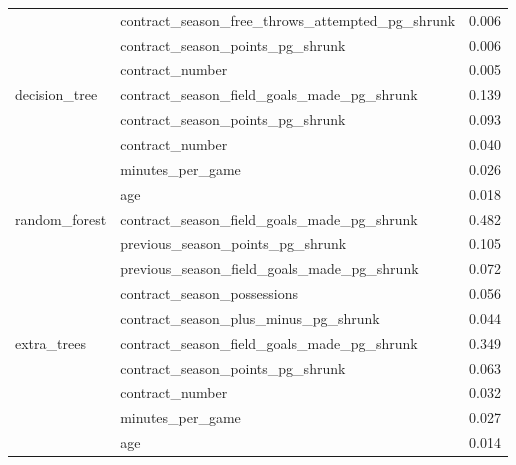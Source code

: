 \documentclass[conference]{IEEEtran}
\begin{document}
\begin{table}[htbp]
\begin{tabular}{lll}
                       & contract\_season\_free\_throws\_attempted\_pg\_shrunk & 0.006      \\
                       & contract\_season\_points\_pg\_shrunk                  & 0.006      \\
                       & contract\_number                                      & 0.005      \\
        \midrule
        decision\_tree & contract\_season\_field\_goals\_made\_pg\_shrunk      & 0.139      \\
                       & contract\_season\_points\_pg\_shrunk                  & 0.093      \\
                       & contract\_number                                      & 0.040      \\
                       & minutes\_per\_game                                    & 0.026      \\
                       & age                                                   & 0.018      \\
        \midrule
        random\_forest & contract\_season\_field\_goals\_made\_pg\_shrunk      & 0.482      \\
                       & previous\_season\_points\_pg\_shrunk                  & 0.105      \\
                       & previous\_season\_field\_goals\_made\_pg\_shrunk      & 0.072      \\
                       & contract\_season\_possessions                         & 0.056      \\
                       & contract\_season\_plus\_minus\_pg\_shrunk             & 0.044      \\
        \midrule
        extra\_trees   & contract\_season\_field\_goals\_made\_pg\_shrunk      & 0.349      \\
                       & contract\_season\_points\_pg\_shrunk                  & 0.063      \\
                       & contract\_number                                      & 0.032      \\
                       & minutes\_per\_game                                    & 0.027      \\
                       & age                                                   & 0.014      \\
        \bottomrule
    \end{tabular}
\end{table}
\end{document}
